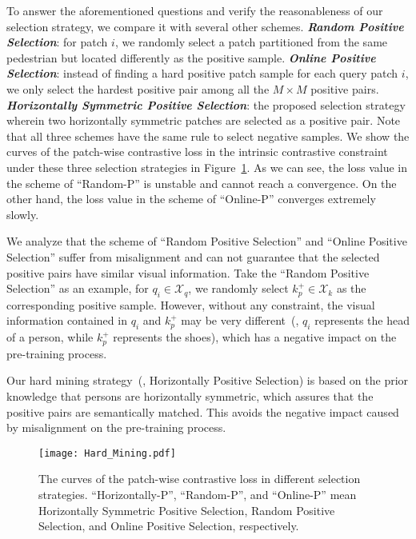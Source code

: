 \documentclass[10pt,twocolumn,letterpaper]{article}
\begin{document}
To answer the aforementioned questions and verify the reasonableness of our selection strategy, we compare it with several other schemes. \textbf{\emph{Random Positive Selection}}: for patch $i$, we randomly select a patch partitioned from the same pedestrian but located differently as the positive sample. \textbf{\emph{Online Positive Selection}}: instead of finding a hard positive patch sample for each query patch $i$, we only select the hardest positive pair among all the $M\times M$ positive pairs. \textbf{\emph{Horizontally Symmetric Positive Selection}}: the proposed selection strategy wherein two horizontally symmetric patches are selected as a positive pair. Note that all three schemes have the same rule to select negative samples. We show the curves of the patch-wise contrastive loss in the intrinsic contrastive constraint under these three selection strategies in Figure~\ref{fig: patch-wise contrastive loss}.
As we can see, the loss value in the scheme of ``Random-P'' is unstable and cannot reach a convergence. On the other hand, the loss value in the scheme of ``Online-P'' converges extremely slowly. 

We analyze that the scheme of ``Random Positive Selection'' and ``Online Positive Selection'' suffer from misalignment and can not guarantee that the selected positive pairs have similar visual information. Take the ``Random Positive Selection'' as an example, for $q_i\in \mathcal{X}_{q}$, we randomly select $k^+_p\in \mathcal{X}_{k}$ as the corresponding positive sample. However, without any constraint, the visual information contained in $q_i$ and $k^+_p$ may be very different~(\eg, $q_i$ represents the head of a person, while $k^+_p$ represents the shoes), which has a negative impact on the pre-training process.

Our hard mining strategy~(\ie, Horizontally Positive Selection) is based on the prior knowledge that persons are horizontally symmetric, which assures that the positive pairs are semantically matched. This avoids the negative impact caused by misalignment on the pre-training process.

\begin{figure}[h!]
	\centering
	\texttt{[image: Hard\_Mining.pdf]}
	\setlength{\abovecaptionskip}{7pt}
	\vspace{-3mm}
	\caption{The curves of the patch-wise contrastive loss in different selection strategies. ``Horizontally-P'', ``Random-P'', and ``Online-P'' mean Horizontally Symmetric Positive Selection, Random Positive Selection, and Online Positive Selection, respectively.}
	\label{fig: patch-wise contrastive loss}
\end{figure}
\end{document}
